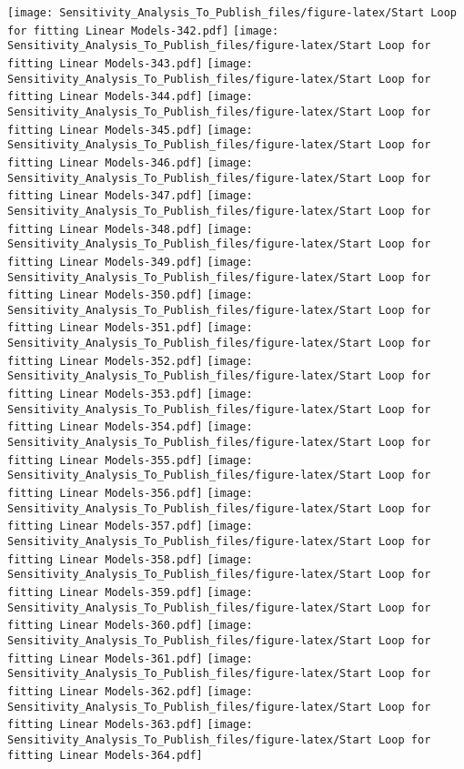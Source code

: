 \documentclass[
]{article}
\begin{document}
\texttt{[image: Sensitivity\_Analysis\_To\_Publish\_files/figure-latex/Start Loop for fitting Linear Models-342.pdf]}
\texttt{[image: Sensitivity\_Analysis\_To\_Publish\_files/figure-latex/Start Loop for fitting Linear Models-343.pdf]}
\texttt{[image: Sensitivity\_Analysis\_To\_Publish\_files/figure-latex/Start Loop for fitting Linear Models-344.pdf]}
\texttt{[image: Sensitivity\_Analysis\_To\_Publish\_files/figure-latex/Start Loop for fitting Linear Models-345.pdf]}
\texttt{[image: Sensitivity\_Analysis\_To\_Publish\_files/figure-latex/Start Loop for fitting Linear Models-346.pdf]}
\texttt{[image: Sensitivity\_Analysis\_To\_Publish\_files/figure-latex/Start Loop for fitting Linear Models-347.pdf]}
\texttt{[image: Sensitivity\_Analysis\_To\_Publish\_files/figure-latex/Start Loop for fitting Linear Models-348.pdf]}
\texttt{[image: Sensitivity\_Analysis\_To\_Publish\_files/figure-latex/Start Loop for fitting Linear Models-349.pdf]}
\texttt{[image: Sensitivity\_Analysis\_To\_Publish\_files/figure-latex/Start Loop for fitting Linear Models-350.pdf]}
\texttt{[image: Sensitivity\_Analysis\_To\_Publish\_files/figure-latex/Start Loop for fitting Linear Models-351.pdf]}
\texttt{[image: Sensitivity\_Analysis\_To\_Publish\_files/figure-latex/Start Loop for fitting Linear Models-352.pdf]}
\texttt{[image: Sensitivity\_Analysis\_To\_Publish\_files/figure-latex/Start Loop for fitting Linear Models-353.pdf]}
\texttt{[image: Sensitivity\_Analysis\_To\_Publish\_files/figure-latex/Start Loop for fitting Linear Models-354.pdf]}
\texttt{[image: Sensitivity\_Analysis\_To\_Publish\_files/figure-latex/Start Loop for fitting Linear Models-355.pdf]}
\texttt{[image: Sensitivity\_Analysis\_To\_Publish\_files/figure-latex/Start Loop for fitting Linear Models-356.pdf]}
\texttt{[image: Sensitivity\_Analysis\_To\_Publish\_files/figure-latex/Start Loop for fitting Linear Models-357.pdf]}
\texttt{[image: Sensitivity\_Analysis\_To\_Publish\_files/figure-latex/Start Loop for fitting Linear Models-358.pdf]}
\texttt{[image: Sensitivity\_Analysis\_To\_Publish\_files/figure-latex/Start Loop for fitting Linear Models-359.pdf]}
\texttt{[image: Sensitivity\_Analysis\_To\_Publish\_files/figure-latex/Start Loop for fitting Linear Models-360.pdf]}
\texttt{[image: Sensitivity\_Analysis\_To\_Publish\_files/figure-latex/Start Loop for fitting Linear Models-361.pdf]}
\texttt{[image: Sensitivity\_Analysis\_To\_Publish\_files/figure-latex/Start Loop for fitting Linear Models-362.pdf]}
\texttt{[image: Sensitivity\_Analysis\_To\_Publish\_files/figure-latex/Start Loop for fitting Linear Models-363.pdf]}
\texttt{[image: Sensitivity\_Analysis\_To\_Publish\_files/figure-latex/Start Loop for fitting Linear Models-364.pdf]}
\end{document}

